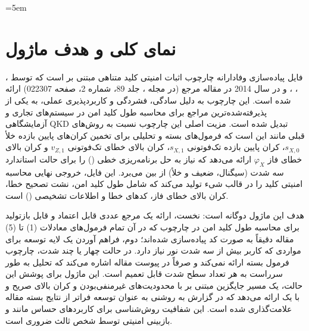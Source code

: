 \sloppy
\emergencystretch=5em

\section{نمای‌ کلی و هدف ماژول}

فایل  پیاده‌سازی وفادارانه چارچوب اثبات امنیتی کلید متناهی مبتنی بر  است که توسط ، ، ،  و  در سال 2014 در مقاله مرجع  (در مجله ، جلد 89، شماره 2، صفحه 022307) ارائه شده است. این چارچوب به دلیل سادگی، فشردگی و کاربردپذیری عملی، به یکی از پذیرفته‌شده‌ترین مراجع برای محاسبه طول کلید امن در سیستم‌های تجاری و آزمایشگاهی QKD تبدیل شده است. مزیت اصلی این چارچوب نسبت به روش‌های قبلی مانند  این است که فرمول‌های بسته و تحلیلی برای تخمین کران‌های پایین بازده خلأ $s_{X,0}$، کران پایین بازده تک‌فوتونی $s_{X,1}$، کران بالای خطای تک‌فوتونی $v_{Z,1}$ و کران بالای خطای فاز $\varphi_X$ ارائه می‌دهد که نیاز به حل برنامه‌ریزی خطی () را برای حالت استاندارد سه شدت (سیگنال،  ضعیف و خلأ) از بین می‌برد. این فایل، خروجی نهایی محاسبه امنیتی کلید را در قالب شیء  تولید می‌کند که شامل طول کلید امن، نشت تصحیح خطا، کران بالای خطای فاز، کدهای خطا و اطلاعات تشخیصی () است.

هدف این ماژول دوگانه است: نخست، ارائه یک مرجع عددی قابل اعتماد و قابل بازتولید برای محاسبه طول کلید امن در چارچوب  که در آن تمام فرمول‌های معادلات (1) تا (5) مقاله دقیقاً به صورت کد پیاده‌سازی شده‌اند؛ دوم، فراهم آوردن یک لایه توسعه برای مواردی که کاربر بیش از سه شدت نور نیاز دارد. در حالت چهار یا چند شدت، چارچوب  فرمول بسته ارائه نمی‌کند و صرفاً در پیوست مقاله اشاره می‌کند که تحلیل به طور سرراست به هر تعداد سطح شدت قابل تعمیم است. این ماژول برای پوشش این حالت، یک مسیر جایگزین مبتنی بر  با محدودیت‌های غیرمنفی‌بودن و کران بالای صریح و با یک  ارائه می‌دهد که در گزارش  به روشنی به عنوان توسعه فراتر از نتایج بسته مقاله علامت‌گذاری شده است. این شفافیت روش‌شناسی برای کاربردهای حساس مانند  و بازبینی امنیتی توسط شخص ثالث ضروری است.


